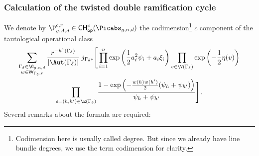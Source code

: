 \subsubsection{Calculation of the twisted double ramification cycle} \label{Ssec:MainFormula}
We denote by
$\P_{g,A,d}^{c,r}\in \mathsf{CH}^c_{\mathsf{op}}(\Picabs_{g,n,d})$
the codimension{\footnote{Codimension here is usually
called degree. But since we already have line bundle degrees,
we use the term codimension for clarity.}}
 $c$ component of the tautological operational class
\begin{multline*}
\sum_{
\substack{\Gamma_\delta\in \G_{g,n,d} \\
w\in \mathsf{W}_{\Gamma_\delta,r}}
}
\frac{r^{-h^1(\Gamma_\delta)}}{|\Aut(\Gamma_\delta)| }
\;
j_{\Gamma_\delta*}\Bigg[
\prod_{i=1}^n \exp\left(\frac12 a_i^2 \psi_i + a_i \xi_i \right)
\prod_{v \in \V(\Gamma_\delta)} \exp\left(-\frac12 \eta(v) \right)
\\
\prod_{e=(h,h')\in \E(\Gamma_\delta)}
\frac{1-\exp\left(-\frac{w(h)w(h')}2(\psi_h+\psi_{h'})\right)}{\psi_h + \psi_{h'}} \Bigg]\, .
\end{multline*}
Several remarks about the formula are required:
